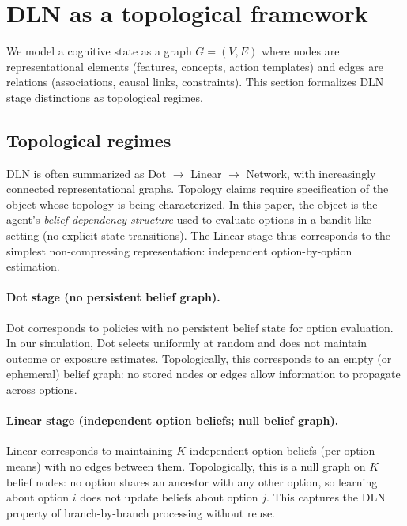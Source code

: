 \documentclass[11pt]{article}
\begin{document}
\section{DLN as a topological framework}

We model a cognitive state as a graph $G=(V,E)$ where nodes are representational elements (features, concepts, action templates) and edges are relations (associations, causal links, constraints). This section formalizes DLN stage distinctions as topological regimes.

\subsection{Topological regimes}

DLN is often summarized as Dot $\rightarrow$ Linear $\rightarrow$ Network, with increasingly connected representational graphs. Topology claims require specification of the object whose topology is being characterized. In this paper, the object is the agent's \emph{belief-dependency structure} used to evaluate options in a bandit-like setting (no explicit state transitions). The Linear stage thus corresponds to the simplest non-compressing representation: independent option-by-option estimation.

\paragraph{Dot stage (no persistent belief graph).}
Dot corresponds to policies with no persistent belief state for option evaluation. In our simulation, Dot selects uniformly at random and does not maintain outcome or exposure estimates.
Topologically, this corresponds to an empty (or ephemeral) belief graph: no stored nodes or edges allow information to propagate across options.

\paragraph{Linear stage (independent option beliefs; null belief graph).}
Linear corresponds to maintaining $K$ independent option beliefs (per-option means) with no edges between them.
Topologically, this is a null graph on $K$ belief nodes: no option shares an ancestor with any other option, so learning about option $i$ does not update beliefs about option $j$.
This captures the DLN property of branch-by-branch processing without reuse.
\end{document}
